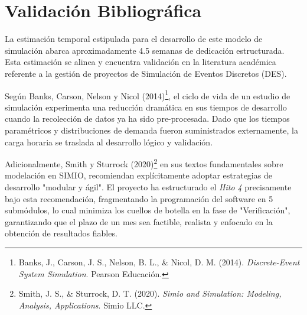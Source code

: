 \documentclass[11pt,letterpaper]{article}
\begin{document}
\newpage
\section{Validación Bibliográfica}
La estimación temporal estipulada para el desarrollo de este modelo de simulación abarca aproximadamente 4.5 semanas de dedicación estructurada. Esta estimación se alinea y encuentra validación en la literatura académica referente a la gestión de proyectos de Simulación de Eventos Discretos (DES).

Según Banks, Carson, Nelson y Nicol (2014)\footnote{Banks, J., Carson, J. S., Nelson, B. L., \& Nicol, D. M. (2014). \textit{Discrete-Event System Simulation}. Pearson Educación.}, el ciclo de vida de un estudio de simulación experimenta una reducción dramática en sus tiempos de desarrollo cuando la recolección de datos ya ha sido pre-procesada. Dado que los tiempos paramétricos y distribuciones de demanda fueron suministrados externamente, la carga horaria se traslada al desarrollo lógico y validación.

Adicionalmente, Smith y Sturrock (2020)\footnote{Smith, J. S., \& Sturrock, D. T. (2020). \textit{Simio and Simulation: Modeling, Analysis, Applications}. Simio LLC.} en sus textos fundamentales sobre modelación en SIMIO, recomiendan explícitamente adoptar estrategias de desarrollo "modular y ágil". El proyecto ha estructurado el \textit{Hito 4} precisamente bajo esta recomendación, fragmentando la programación del software en 5 submódulos, lo cual minimiza los cuellos de botella en la fase de "Verificación", garantizando que el plazo de un mes sea factible, realista y enfocado en la obtención de resultados fiables.
\end{document}
